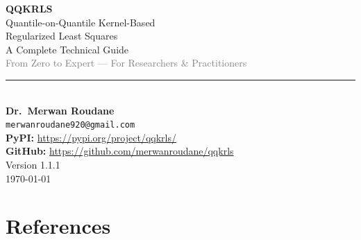 \documentclass[12pt,a4paper]{article}
\theoremstyle{definition}
\begin{document}
\begin{titlepage}
\begin{center}
\vspace*{2cm}
{\Huge\bfseries\textcolor{deepblue}{QQKRLS}}\\[0.5cm]
{\LARGE\textcolor{primaryblue}{Quantile-on-Quantile Kernel-Based\\[0.2cm] Regularized Least Squares}}\\[1.5cm]
{\Large\textcolor{deepblue!70!black}{A Complete Technical Guide}}\\[0.3cm]
{\large\textcolor{gray}{From Zero to Expert --- For Researchers \& Practitioners}}\\[3cm]

\textcolor{primaryblue}{\rule{0.6\textwidth}{1.5pt}}\\[1cm]

{\Large \textbf{Dr.\ Merwan Roudane}}\\[0.4cm]
{\normalsize \texttt{merwanroudane920@gmail.com}}\\[0.3cm]
{\small
\textcolor{primaryblue}{\textbf{PyPI:}} \url{https://pypi.org/project/qqkrls/}\\
\textcolor{accentgreen}{\textbf{GitHub:}} \url{https://github.com/merwanroudane/qqkrls}
}\\[2cm]

{\large Version 1.1.1}\\[0.5cm]
{\normalsize \today}
\end{center}
\end{titlepage}

\tableofcontents
\newpage





\newpage
\section{References}
\end{document}

